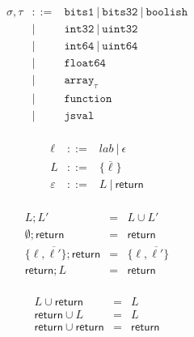 \documentclass{article}
\newcommand{\seq}[1]{\overline{{#1}}}
\newcommand{\boolean}{\mathtt{bits1}}
\newcommand{\uintone}{\mathtt{uint8}}
\newcommand{\uinttwo}{\mathtt{uint16}}
\newcommand{\uintfour}{\mathtt{uint32}}
\newcommand{\uinteight}{\mathtt{uint64}}
\newcommand{\intone}{\mathtt{int8}}
\newcommand{\inttwo}{\mathtt{int16}}
\newcommand{\intfour}{\mathtt{int32}}
\newcommand{\inteight}{\mathtt{int64}}
\newcommand{\float}{\mathtt{float32}}
\newcommand{\double}{\mathtt{float64}}
\newcommand{\arr}[1]{\mathtt{array}_{#1}}
\newcommand{\any}{\mathtt{jsval}}
\newcommand{\str}{\mathtt{string}}
\newcommand{\undef}{\mathtt{undefined}}
\newcommand{\nul}{\mathtt{null}}
\newcommand{\num}{\mathtt{number}}
\newcommand{\obj}{\mathtt{object}}
\newcommand{\mustret}{\mathsf{return}}
\newcommand{\seqcomp}{\mathrel{;}}
\newcommand{\word}{\mathtt{bits32}}
\newcommand{\function}{\mathtt{function}}
\newcommand{\union}[2]{{#1}\mathrel{|}{#2}}
\newcommand{\boolish}{\mathtt{boolish}}
\begin{document}
\[
\begin{array}{rcl}
\sigma, \tau & ::= & \boolean ~|~ \word ~|~ \boolish \\
             &  |  & \intfour ~|~ \uintfour \\
             &  |  & \inteight ~|~ \uinteight \\
             &  |  & \double \\
             &  |  & \arr{\tau} \\
             &  |  & \function \\
             &  |  & \any \\
\end{array}
\]

\[
\begin{array}{rcl}
\ell        & ::= & \mathit{lab} ~|~ \epsilon \\
L           & ::= & \{ \seq{\ell} \} \\
\varepsilon & ::= & L ~|~ \mustret \\
\end{array}
\]

\[
\begin{array}{rcl}
L                       \seqcomp L'       & = & L \cup L' \\
\emptyset               \seqcomp \mustret & = & \mustret \\
\{ \ell, \seq{\ell'} \} \seqcomp \mustret & = & \{ \ell, \seq{\ell'} \} \\
\mustret                \seqcomp L        & = & \mustret \\
\end{array}
\]

\[
\begin{array}{rcl}
L        \cup \mustret & = & L \\
\mustret \cup L        & = & L \\
\mustret \cup \mustret & = & \mustret \\
\end{array}
\]
\end{document}
